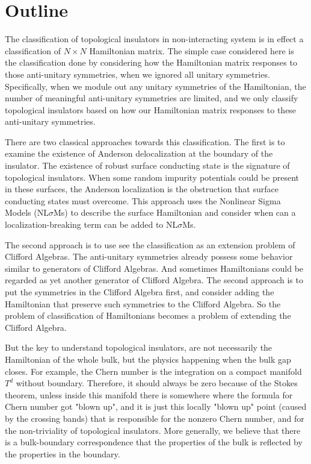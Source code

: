 \section{Outline}
\label{sec:Outline}
 
The classification of topological insulators in non-interacting system is in
effect a classification of $N\times N$ Hamiltonian matrix. %
The simple case considered here
is the classification done by considering how the Hamiltonian matrix responses
to those anti-unitary symmetries, when we ignored all unitary
symmetries. Specifically, when we module out any unitary symmetries of the
Hamiltonian, the number of meaningful anti-unitary symmetries are limited, and
we only classify topological insulators based on how our Hamiltonian matrix
responses to these anti-unitary symmetries.

There are two classical approaches towards this classification. The first
\cite{Schnyder2008} is to examine the existence of Anderson delocalization at
the boundary of the insulator. The existence of robust surface conducting state
is the signature of topological insulators. When some random impurity potentials
could be present in these surfaces, the Anderson localization is the obstruction
that surface conducting states must overcome. This approach uses the Nonlinear
Sigma Models (NL$\sigma$Ms) to describe the surface Hamiltonian and consider
when can a localization-breaking term can be added to NL$\sigma$Ms.

The second approach\cite{Kitaev2009a} is to use see the classification as an
extension problem of Clifford Algebras. The anti-unitary symmetries already
possess some behavior similar to generators of Clifford Algebras. And sometimes
Hamiltonians could be regarded as yet another generator of Clifford
Algebra\cite{Morimoto2013}. The second approach is to put the symmetries in
the Clifford Algebra first, and consider adding the Hamiltonian that preserve
such symmetries to the Clifford Algebra. So the problem of classification of
Hamiltonians becomes a problem of extending the Clifford Algebra.

But the key to understand topological insulators, are not necessarily the
Hamiltonian of the whole bulk, but the physics happening when the bulk gap
closes. For example, the Chern number is the integration on a compact manifold $T^d$
without boundary. Therefore, it should always be zero because of the Stokes
theorem, unless inside this manifold there is somewhere where the formula for
Chern number got "blown up", and it is just this locally "blown up" point
(caused by the crossing bands) that is responsible for the nonzero Chern number, and
for the non-triviality of topological insulators. More generally, we believe
that there is a bulk-boundary correspondence that the properties of the bulk is
reflected by the properties in the boundary.


